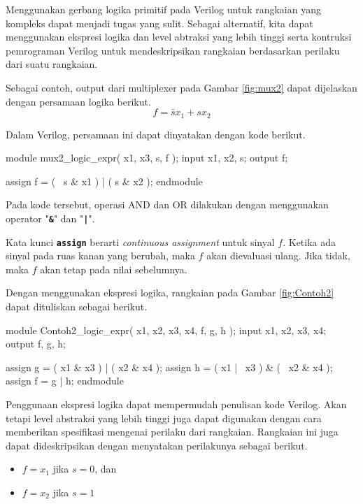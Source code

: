 \documentclass[a4paper,11pt,bahasa]{extarticle}
\begin{document}
Menggunakan gerbang logika primitif pada Verilog untuk rangkaian yang
kompleks dapat menjadi tugas yang sulit.
Sebagai alternatif, kita dapat menggunakan ekspresi logika dan
level abtraksi yang lebih tinggi
serta kontruksi pemrograman Verilog untuk mendeskripsikan rangkaian
berdasarkan perilaku dari suatu rangkaian.

Sebagai contoh, output dari multiplexer pada Gambar \ref{fig:mux2}
dapat dijelaskan dengan persamaan logika berikut.
\begin{equation*}
f = \bar{s}x_1 + sx_2
\end{equation*}

Dalam Verilog, persamaan ini dapat dinyatakan dengan kode berikut.
{
\begin{verilogcode}
module mux2_logic_expr( x1, x3, s, f );
  input x1, x2, s;
  output f;

  assign f = ( ~s & x1 ) | ( s & x2 );
endmodule
\end{verilogcode}
}

Pada kode tersebut, operasi AND dan OR dilakukan dengan menggunakan
operator "{\tt\textbf{\&}}" dan "{\tt\textbf{|}}".

Kata kunci {\tt\textbf{assign}} berarti {\it continuous assignment} untuk
sinyal $f$.
Ketika ada sinyal pada ruas kanan yang berubah, maka $f$ akan dievaluasi ulang.
Jika tidak, maka $f$ akan tetap pada nilai sebelumnya.

Dengan menggunakan ekspresi logika, rangkaian pada Gambar \ref{fig:Contoh2}
dapat dituliskan sebagai berikut.
{
\begin{verilogcode}
module Contoh2_logic_expr( x1, x2, x3, x4, f, g, h );
  input x1, x2, x3, x4;
  output f, g, h;

  assign g = ( x1 &  x3 ) | (  x2 & x4 );
  assign h = ( x1 | ~x3 ) & ( ~x2 & x4 );
  assign f = g | h;
endmodule
\end{verilogcode}
}

Penggunaan ekspresi logika dapat mempermudah penulisan kode Verilog.
Akan tetapi level abstraksi yang lebih tinggi juga dapat digunakan
dengan cara memberikan spesifikasi mengenai perilaku dari rangkaian.
Rangkaian ini juga dapat dideskripsikan dengan menyatakan perilakunya
sebagai berikut.
\begin{itemize}
\item $f = x_1$ jika $s = 0$, dan
\item $f = x_2$ jika $s = 1$
\end{itemize}
\end{document}
